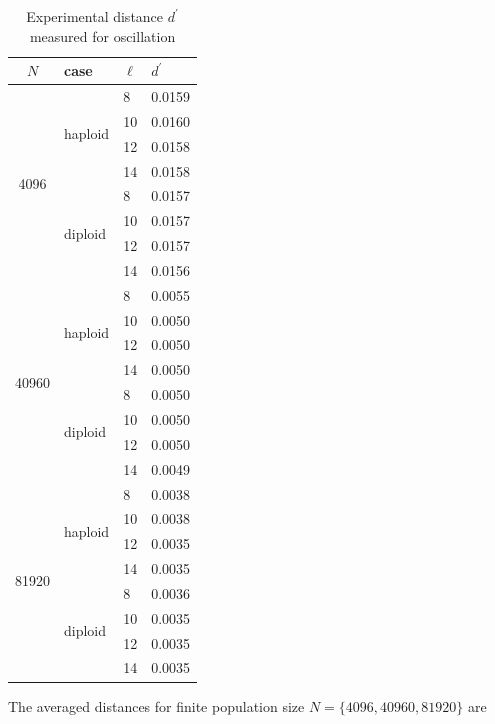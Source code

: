 \begin{table}[ht]
\caption{Experimental distance $d^\prime$ measured for oscillation}
\centering
\begin{tabularx}{0.75\textwidth}{ c *{3}{X}}
\toprule
$N$ & case & $\ell$ & $d^\prime$ \\
\midrule
\multirow{8}{*}{4096} & \multirow{4}{*}{haploid} 	& 8 & 0.0159 \\
		      &   				& 10 & 0.0160 \\ 
		      & 			 	& 12 & 0.0158 \\
		      &  	 			& 14 & 0.0158 \\ 
		      \cmidrule(l){2-4}
		      & \multirow{4}{*}{diploid} 	& 8 & 0.0157 \\
		      &  	 			& 10 & 0.0157 \\
		      & 			 	& 12 & 0.0157 \\
		      &  	 			& 14 & 0.0156 \\
		      \midrule
\multirow{8}{*}{40960} & \multirow{4}{*}{haploid} 	& 8 & 0.0055 \\
		      &   				& 10 & 0.0050 \\	
		      & 				& 12 & 0.0050 \\	
		      &  	 			& 14 & 0.0050 \\
		      \cmidrule(l){2-4}
		      & \multirow{4}{*}{diploid} 	& 8 & 0.0050 \\
		      &  	 			& 10 & 0.0050 \\
		      & 				& 12 & 0.0050 \\
		      &  	 			& 14 & 0.0049 \\
		      \midrule
\multirow{8}{*}{81920} & \multirow{4}{*}{haploid} 	& 8 & 0.0038 \\
		      &   				& 10 & 0.0038 \\
		      & 				& 12 & 0.0035 \\
		      &  	 			& 14 & 0.0035 \\
		      \cmidrule(l){2-4}
		      & \multirow{4}{*}{diploid} 	& 8 & 0.0036 \\	
		      &  	 			& 10 & 0.0035 \\
		      &  				& 12 & 0.0035 \\
		      &  	 			& 14 & 0.0035 \\
\bottomrule
\end{tabularx}
\label{tableExperimentalDistance}
\end{table}

The averaged distances for finite population size $N = \{4096,  40960,  81920\}$ are $ $

